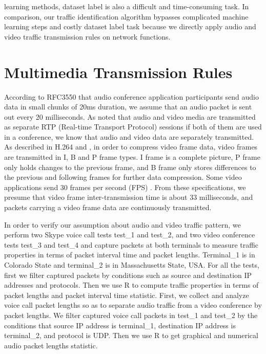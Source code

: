 \documentclass[master]{thesis}
\begin{document}
learning methods, dataset label is also a difficult and time-consuming task. In comparison, our traffic identification algorithm bypasses complicated machine learning steps and costly dataset label task because we directly apply audio and video traffic transmission rules on network functions. 

\chapter{Multimedia Transmission Rules}
\label{chap:multimedia.transmission.rules}

According to RFC3550 \cite{schulzrinne2003rfc3550} that audio conference application participants send audio data in small chunks of 20ms duration, we assume that an audio packet is sent out every 20 milliseconds. As \cite{schulzrinne2003rfc3550} noted that audio and video media are transmitted as separate RTP (Real-time Transport Protocol) sessions if both of them are used in a conference, we know that audio and video data are separately transmitted. As described in H.264 \cite{itu2010advanced} and \cite{video2020}, in order to compress video frame data, video frames are transmitted in I, B and P frame types. I frame is a complete picture, P frame only holds changes to the previous frame, and B frame only stores differences to the previous and following frames for further data compression. Some video applications send 30 frames per second (FPS) \cite{frame2020}. From these specifications, we presume that video frame inter-transmission time is about 33 milliseconds, and packets carrying a video frame data are continuously transmitted. 

In order to verify our assumption about audio and video traffic pattern, we perform two Skype voice call tests test\_1 and test\_2, and two video conference tests test\_3 and test\_4 and capture packets at both terminals to measure traffic properties in terms of packet interval time and packet lengths. Terminal\_1 is in Colorado State and terminal\_2 is in Massachusetts State, USA. For all the tests, first we filter captured packets by conditions such as source and destination IP addresses and protocols. Then we use R \cite{r2020} to compute traffic properties in terms of packet lengths and packet interval time statistic. First, we collect and analyze voice call packet lengths so as to separate audio traffic from a video conference by packet lengths. We filter captured voice call packets in test\_1 and test\_2 by the conditions that source IP address is terminal\_1, destination IP address is terminal\_2, and protocol is UDP. Then we use R to get graphical and numerical audio packet lengths statistic. 
\end{document}
